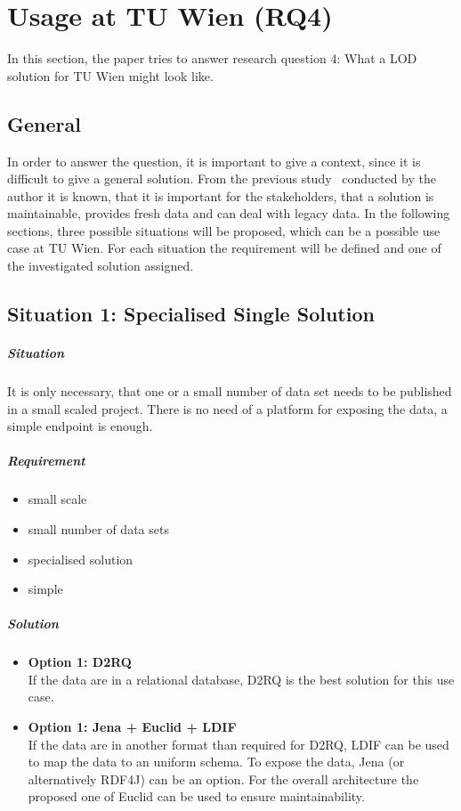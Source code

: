 \chapter{Usage at TU Wien (RQ4)}\label{ch:tuwien}

In this section, the paper tries to answer research question 4: What a LOD solution for TU Wien might look like.

\section{General}
In order to answer the question, it is important to give a context, since it is difficult to give a general solution. From the previous study~\cite{baronyai_publishing_2016} conducted by the author it is known, that it is important for the stakeholders, that a solution is maintainable, provides fresh data and can deal with legacy data. In the following sections, three possible situations will be proposed, which can be a possible use case at TU Wien. For each situation the requirement will be defined and one of the investigated solution assigned.

\section{Situation 1: Specialised Single Solution}
\paragraph{Situation} It is only necessary, that one or a small number of data set needs to be published in a small scaled project. There is no need of a platform for exposing the data, a simple endpoint is enough.  

\paragraph{Requirement}
\begin{itemize}
\item small scale
\item small number of data sets
\item specialised solution
\item simple
\end{itemize}

\paragraph{Solution}
\begin{itemize}
\item \textbf{Option 1: D2RQ} \\
If the data are in a relational database, D2RQ is the best solution for this use case.
\item \textbf{Option 1: Jena + Euclid + LDIF} \\
If the data are in another format than required for D2RQ, LDIF can be used to map the data to an uniform schema. To expose the data, Jena (or alternatively RDF4J) can be an option. For the overall architecture the proposed one of Euclid can be used to ensure maintainability.
\end{itemize}

